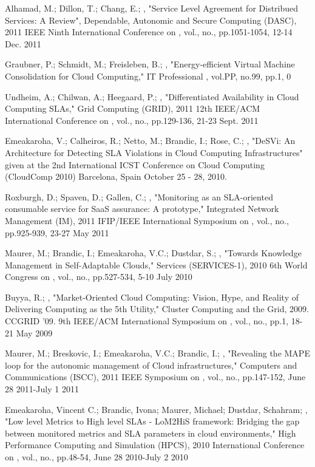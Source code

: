 \documentclass[a4paper]{llncs}
\begin{document}
%
\begin{thebibliography}{[MT1]}

Alhamad, M.; Dillon, T.; Chang, E.; ,
"Service Level Agreement for Distribued Services: A Review",
Dependable, Autonomic and Secure Computing (DASC), 2011 IEEE Ninth International Conference on , vol., no., pp.1051-1054, 12-14 Dec. 2011

Graubner, P.; Schmidt, M.; Freisleben, B.; ,
"Energy-efficient Virtual Machine Consolidation for Cloud Computing," IT Professional , vol.PP, no.99, pp.1, 0

Undheim, A.; Chilwan, A.; Heegaard, P.; ,
"Differentiated Availability in Cloud Computing SLAs," Grid Computing (GRID), 2011 12th IEEE/ACM International Conference on , vol., no., pp.129-136, 21-23 Sept. 2011

Emeakaroha, V.; Calheiros, R.; Netto, M.; Brandic, I.; Rose, C.; ,
"DeSVi: An Architecture for Detecting SLA Violations in Cloud Computing Infrastructures" given at the 2nd International ICST Conference on Cloud Computing (CloudComp 2010) Barcelona, Spain October 25 - 28, 2010.

Roxburgh, D.; Spaven, D.; Gallen, C.; ,
"Monitoring as an SLA-oriented consumable service for SaaS assurance: A prototype," Integrated Network Management (IM), 2011 IFIP/IEEE International Symposium on , vol., no., pp.925-939, 23-27 May 2011

Maurer, M.; Brandic, I.; Emeakaroha, V.C.; Dustdar, S.; ,
"Towards Knowledge Management in Self-Adaptable Clouds," Services (SERVICES-1), 2010 6th World Congress on , vol., no., pp.527-534, 5-10 July 2010

Buyya, R.; ,
"Market-Oriented Cloud Computing: Vision, Hype, and Reality of Delivering Computing as the 5th Utility," Cluster Computing and the Grid, 2009. CCGRID '09. 9th IEEE/ACM International Symposium on , vol., no., pp.1, 18-21 May 2009

Maurer, M.; Breskovic, I.; Emeakaroha, V.C.; Brandic, I.; ,
"Revealing the MAPE loop for the autonomic management of Cloud infrastructures," Computers and Communications (ISCC), 2011 IEEE Symposium on , vol., no., pp.147-152, June 28 2011-July 1 2011

Emeakaroha, Vincent C.; Brandic, Ivona; Maurer, Michael; Dustdar, Schahram; ,
"Low level Metrics to High level SLAs - LoM2HiS framework: Bridging the gap between monitored metrics and SLA parameters in cloud environments," High Performance Computing and Simulation (HPCS), 2010 International Conference on , vol., no., pp.48-54, June 28 2010-July 2 2010


\end{thebibliography}
\end{document}
